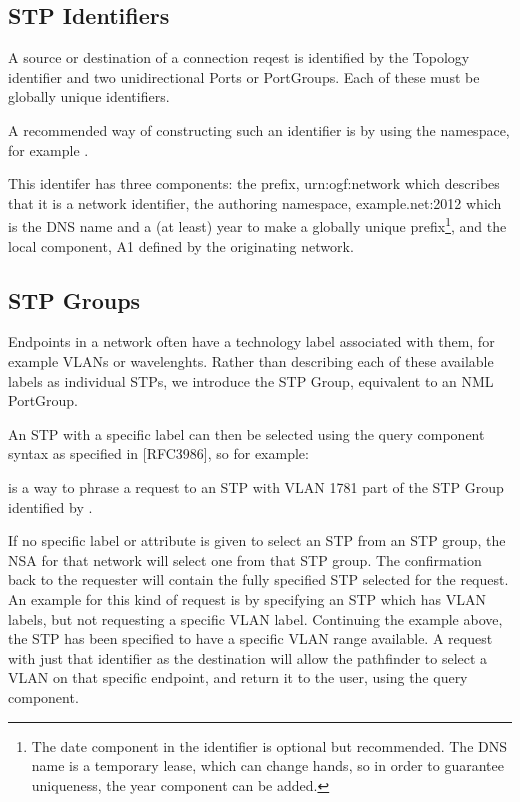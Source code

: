 \documentclass[12pt]{article}  %
\begin{document}
\subsection{STP Identifiers}

 A source or destination of a connection reqest is identified by 
the Topology identifier and two unidirectional Ports or PortGroups. Each of these 
must be globally unique identifiers.

 A recommended way of constructing such an identifier is by using 
the  namespace, for example .

 This identifer has three components: the prefix, urn:ogf:network 
which describes that it is a network identifier, the authoring namespace, example.net:2012 
which is the DNS name and a (at least) year to make a globally unique prefix\footnote{  
The date component in the identifier is optional but recommended. The DNS name 
is a temporary lease, which can change hands, so in order to guarantee uniqueness, 
the year component can be added.}, and the local component, A1 defined by the originating 
network. \label{h.nk6ov0u4wctm}


\subsection{STP Groups}

 Endpoints in a network often have a technology label associated 
with them, for example VLANs or wavelenghts. Rather than describing each of these 
available labels as individual STPs, we introduce the STP Group, equivalent to 
an NML PortGroup.

 An STP with a specific label can then be selected using the query 
component syntax as specified in [RFC3986], so for example:

 is a way to phrase 
a request to an STP with VLAN 1781 part of the STP Group identified by .


 If no specific label or attribute is given to select an STP from 
an STP group, the NSA for that network will select one from that STP group. The 
confirmation back to the requester will contain the fully specified STP selected 
for the request. An example for this kind of request is by specifying an STP which 
has VLAN labels, but not requesting a specific VLAN label. Continuing the example 
above, the STP  has been specified to have a 
specific VLAN range available. A request with just that identifier as the destination 
will allow the pathfinder to select a VLAN on that specific endpoint, and return 
it to the user, using the query component.\label{h.p5scbjtwxk7s}
\end{document}
